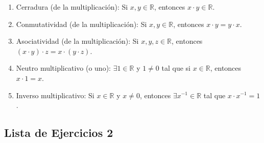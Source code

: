 \documentclass[11pt]{article}
\newcommand{\R}{\mathbb{R}}
\begin{document}
\begin{enumerate}[start=6]%
    \item Cerradura (de la multiplicación): Si $x,y\in \R$, entonces $x\cdot y\in \R$.

    \item Conmutatividad (de la multiplicación): Si $x,y\in \R$, entonces $x\cdot y = y\cdot x$.

    \item Asociatividad (de la multiplicación): Si $x,y,z\in \R$, entonces $(x\cdot y) \cdot z = x \cdot (y\cdot z)$.

    \item Neutro multiplicativo (o uno): $\exists 1\in \R$ y $1\neq 0$ tal que si $x\in \R$, entonces $x\cdot 1 = x$.

    \item Inverso multiplicativo: Si $x\in \R$ y $x\neq 0$, entonces $\exists x^{-1}\in \R$ tal que $x\cdot x^{-1}=1$.
\end{enumerate}

\subsection*{Lista de Ejercicios 2}
\end{document}
